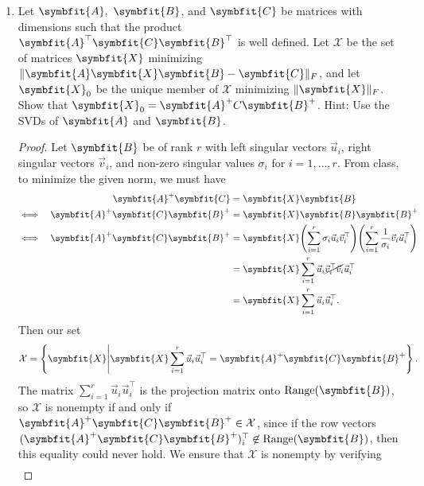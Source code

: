 \documentclass{article}
\theoremstyle{definition}
\newcommand{\mat}[1]{\symbfit{#1}}
\DeclareMathOperator{\range}{Range}
\begin{document}
\begin{enumerate}[leftmargin=\labelsep]
	\item Let \(\mat{A},\ \mat{B}\), and \(\mat{C}\) be matrices with dimensions such that the product \(\mat{A}^\top\mat{C}\mat{B}^\top\) is well defined. Let \(\mathcal{X}\) be the set of matrices \(\mat{X}\) minimizing \(\|\mat{A}\mat{X} \mat{B} - \mat{C}\|_F\), and let \(\mat{X}_0\) be the unique member of \(\mathcal{X}\) minimizing \(\|\mat{X}\|_F\). Show that \(\mat{X}_0 = \mat{A}^+C\mat{B}^+\). Hint: Use the SVDs of \(\mat{A}\) and \(\mat{B}\).
	      \begin{proof}
		      Let \(\mat{B}\) be of rank \(r\) with left singular vectors \(\vec{u}_i\), right singular vectors \(\vec{v}_i\), and non-zero singular values \(\sigma_i\) for \(i = 1, \dots, r\). From class, to minimize the given norm, we must have
		      \begin{alignat*}{4}
			           &  & \mat{A}^+\mat{C}          & = \mat{X}\mat{B}                                                                                                            \\
			      \iff &  & \mat{A}^+\mat{C}\mat{B}^+ & = \mat{X}\mat{B}\mat{B}^+                                                                                                   \\
			      \iff &  & \mat{A}^+\mat{C}\mat{B}^+ & = \mat{X}\qty(\sum_{i=1}^r \sigma_i \vec{u}_i\vec{v}_i^\top)\qty(\sum_{i = 1}^r \frac{1}{\sigma_i} \vec{v}_i\vec{u}_i^\top) \\
			           &  &                           & = \mat{X} \sum_{i = 1}^r \vec{u}_i\cancel{\vec{v}_i^\top\vec{v}_i}\vec{u}_i^\top                                            \\
			           &  &                           & = \mat{X} \sum_{i = 1}^r \vec{u}_i\vec{u}_i^\top.                                                                           \\
		      \end{alignat*}
		      Then our set
		      \[\mathcal{X} = \left\{\mat{X} \middle| \mat{X} \sum_{i = 1}^r \vec{u}_i\vec{u}_i^\top = \mat{A}^+\mat{C}\mat{B}^+\right\}.\]
		      The matrix \(\sum_{i = 1}^r \vec{u}_i\vec{u}_i^\top\) is the projection matrix onto \(\range(\mat{B})\), so \(\mathcal{X}\) is nonempty if and only if \(\mat{A}^+\mat{C}\mat{B}^+ \in \mathcal{X}\), since if the row vectors \((\mat{A}^+\mat{C}\mat{B}^+)_i^\top\not\in \range(\mat{B})\), then this equality could never hold. We ensure that \(\mathcal{X}\) is nonempty by verifying
		      \begin{align*}

\end{align*}
\end{proof}
\end{enumerate}
\end{document}
